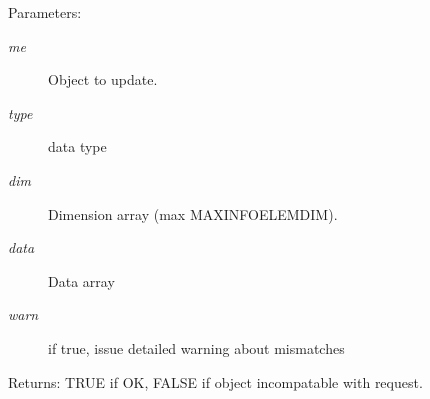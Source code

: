 \begin{Desc}
\item[Parameters:]
\begin{description}
\item[{\em me}]Object to update. \item[{\em type}]data type \item[{\em dim}]Dimension array (max MAXINFOELEMDIM). \item[{\em data}]Data array \item[{\em warn}]if true, issue detailed warning about mismatches \end{description}
\end{Desc}
\begin{Desc}
\item[Returns:]TRUE if OK, FALSE if object incompatable with request. \end{Desc}
